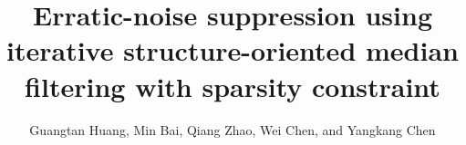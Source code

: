 

\title{Erratic-noise suppression using iterative structure-oriented  median filtering with sparsity constraint}
\author{Guangtan Huang\footnotemark[1], Min Bai\footnotemark[3], Qiang Zhao\footnotemark[2], Wei Chen\footnotemark[3], and Yangkang Chen\footnotemark[1]}
\renewcommand{\thefootnote}{\fnsymbol{footnote}}
\address{
\footnotemark[1]
School of Earth Sciences\\
Zhejiang University\\
Hangzhou, Zhejiang Province, China, 310027\\
yangkang.chen@zju.edu.cn \\
\footnotemark[2]CNPC Key Laboratory of Geophysical Prospecting\\
China University of Petroleum (East China)\\
Qingdao 266580, China\\
zq\_clark@163.com\\
\footnotemark[3]Key Laboratory of Exploration Technology for Oil and Gas Resources of Ministry of Education\\
Yangtze University\\
Wuhan 430100, China\\
chenwei2014@yangtzeu.edu.cn
}

\DeclareRobustCommand{\dlo}[1]{}
\DeclareRobustCommand{\wen}[1]{#1}


